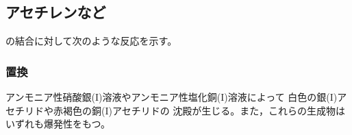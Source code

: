 \subsection{アセチレンなど}
の結合に対して次のような反応を示す。
\subsubsection*{置換}
アンモニア性硝酸銀(I)溶液やアンモニア性塩化銅(I)溶液によって
白色の銀(I)アセチリドや赤褐色の銅(I)アセチリドの
沈殿が生じる。また，これらの生成物はいずれも爆発性をもつ。
